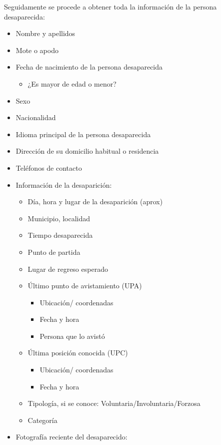 Seguidamente se procede a obtener toda la información de la persona desaparecida:
\begin{itemize}
    \item Nombre y apellidos
    \item Mote o apodo
    \item Fecha de nacimiento de la persona desaparecida
    \begin{itemize}
        \item ¿Es mayor de edad o menor?
    \end{itemize}
    \item Sexo
    \item Nacionalidad
    \item Idioma principal de la persona desaparecida
    \item Dirección de su domicilio habitual o residencia
    \item Teléfonos de contacto
    \item Información de la desaparición:
    \begin{itemize}
        \item Día, hora y lugar de la desaparición (aprox)
        \item Municipio, localidad
        \item Tiempo desaparecida
        \item Punto de partida
        \item Lugar de regreso esperado
        \item Último punto de avistamiento (UPA)
        \begin{itemize}
            \item Ubicación/ coordenadas
            \item Fecha y hora
            \item Persona que lo avistó
        \end{itemize}
        \item Última posición conocida (UPC)
        \begin{itemize}
            \item Ubicación/ coordenadas
            \item Fecha y hora
        \end{itemize}
        \item Tipología, si se conoce: Voluntaria/Involuntaria/Forzosa
        \item Categoría
    \end{itemize}
    \item Fotografía reciente del desaparecido:

\end{itemize}
